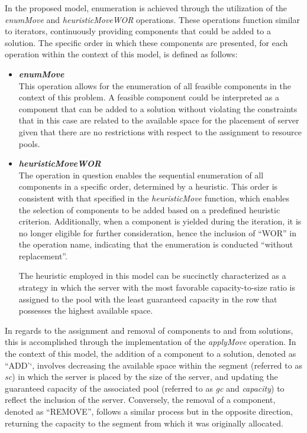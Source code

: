 In the proposed model, enumeration is achieved through the utilization of the
\textit{enumMove} and \textit{heuristicMoveWOR} operations. These operations
function similar to iterators, continuously providing components that could be
added to a solution. The specific order in which these components
are presented, for each operation within the context of this model, is defined
as follows:

\begin{itemize}
  \item \textbf{{\textit{enumMove}}}\\
        This operation allows for the enumeration
        of all feasible components in the context of this problem. A feasible
        component could be interpreted as a component that can be added to a solution
        without violating the constraints that in this case are related to the
        available space for the placement of server given that there are no
        restrictions with respect to the assignment to resource pools.

  \item \textbf{{\textit{heuristicMoveWOR}}}\\
        The operation in question enables the sequential enumeration of all
        components in a specific order, determined by a heuristic. This order is
        consistent with that specified in the \textit{heuristicMove} function,
        which enables the selection of components to be added based on a
        predefined heuristic criterion.  Additionally, when a
        component is yielded during the iteration, it is no longer eligible for
        further consideration, hence the inclusion of ``WOR'' in the operation name,
        indicating that the enumeration is conducted ``without replacement''.

        The heuristic employed in this model can be succinctly characterized as
        a strategy in which the server with the most favorable capacity-to-size
        ratio is assigned to the pool with the least guaranteed capacity in the
        row that possesses the highest available space.
\end{itemize}

In regards to the assignment and removal of components to and from solutions,
this is accomplished through the implementation of the \textit{applyMove} operation.
In the context of this model, the addition of a component to a solution, denoted
as ``ADD'`, involves decreasing the available space within the segment (referred
to as \textit{sc}) in which the server is placed by the size of the server, and
updating the guaranteed capacity of the associated pool (referred to as
\textit{gc} and \textit{capacity}) to reflect the inclusion of the server.
Conversely, the removal of a component, denoted as ``REMOVE'', follows a similar
process but in the opposite direction, returning the capacity to the segment
from which it was originally allocated.

